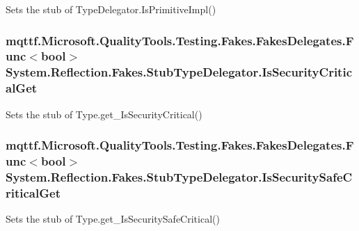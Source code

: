 Sets the stub of Type\-Delegator.\-Is\-Primitive\-Impl()

\hypertarget{class_system_1_1_reflection_1_1_fakes_1_1_stub_type_delegator_a152b335ab87c5090ffc4f754f4e97bde}{
\subsubsection[{Is\-Security\-Critical\-Get}]{\setlength{\rightskip}{0pt plus 5cm}mqttf.\-Microsoft.\-Quality\-Tools.\-Testing.\-Fakes.\-Fakes\-Delegates.\-Func$<$bool$>$ System.\-Reflection.\-Fakes.\-Stub\-Type\-Delegator.\-Is\-Security\-Critical\-Get}}\label{class_system_1_1_reflection_1_1_fakes_1_1_stub_type_delegator_a152b335ab87c5090ffc4f754f4e97bde}


Sets the stub of Type.\-get\-\_\-\-Is\-Security\-Critical()

\hypertarget{class_system_1_1_reflection_1_1_fakes_1_1_stub_type_delegator_a7950a95a365c5f0e4e314986c98e50c3}{
\subsubsection[{Is\-Security\-Safe\-Critical\-Get}]{\setlength{\rightskip}{0pt plus 5cm}mqttf.\-Microsoft.\-Quality\-Tools.\-Testing.\-Fakes.\-Fakes\-Delegates.\-Func$<$bool$>$ System.\-Reflection.\-Fakes.\-Stub\-Type\-Delegator.\-Is\-Security\-Safe\-Critical\-Get}}\label{class_system_1_1_reflection_1_1_fakes_1_1_stub_type_delegator_a7950a95a365c5f0e4e314986c98e50c3}


Sets the stub of Type.\-get\-\_\-\-Is\-Security\-Safe\-Critical()

